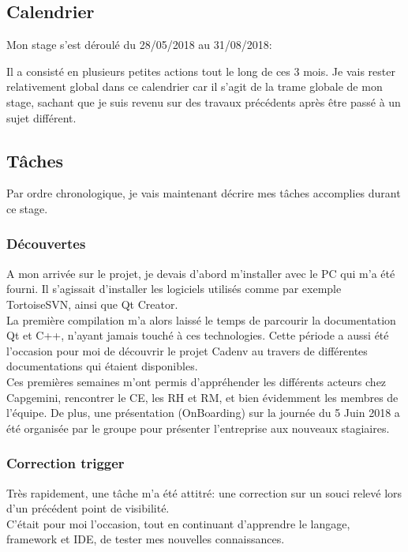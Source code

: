 \documentclass{rapport}
\begin{document}
\subsection{Calendrier}

Mon stage s'est déroulé du 28/05/2018 au 31/08/2018:\\


Il a consisté en plusieurs petites actions tout le long de ces 3 mois. Je vais rester relativement global dans ce calendrier car il s'agit de la trame globale de mon stage, sachant que je suis revenu sur des travaux précédents après être passé à un sujet différent.

\subsection{Tâches}

Par ordre chronologique, je vais maintenant décrire mes tâches accomplies durant ce stage. 

\subsubsection{Découvertes}

A mon arrivée sur le projet, je devais d'abord m'installer avec le PC qui m'a été fourni. Il s'agissait d'installer les logiciels utilisés comme par exemple TortoiseSVN, ainsi que Qt Creator.\\
La première compilation m'a alors laissé le temps de parcourir la documentation Qt et C++, n'ayant jamais touché à ces technologies. Cette période a aussi été l'occasion pour moi de découvrir le projet Cadenv au travers de différentes documentations qui étaient disponibles.\\

Ces premières semaines m'ont permis d'appréhender les différents acteurs chez Capgemini, rencontrer le CE, les RH et RM, et bien évidemment les membres de l'équipe. De plus, une présentation (OnBoarding) sur la journée du 5 Juin 2018 a été organisée par le groupe pour présenter l'entreprise aux nouveaux stagiaires.

\subsubsection{Correction trigger}

Très rapidement, une tâche m'a été attitré: une correction sur un souci relevé lors d'un précédent point de visibilité.\\
C'était pour moi l'occasion, tout en continuant d'apprendre le langage, framework et IDE, de tester mes nouvelles connaissances.\\
\end{document}
